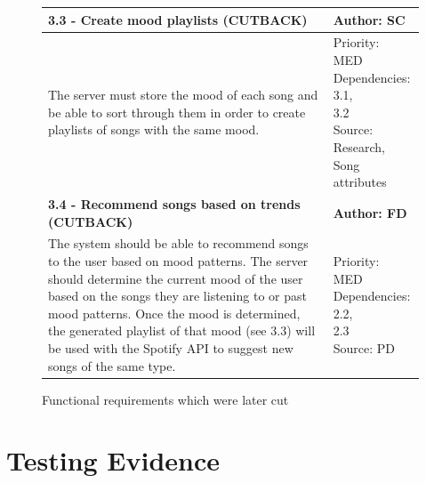 \documentclass[10pt, notitlepage]{report}
\begin{document}
\newpage

\begin{figure}[h]
\centering

\begin{tabular}{| p{13cm} | p{3cm} |}
\hline
\textbf{3.3 - Create mood playlists (CUTBACK)} & \textbf{Author: SC} \\
\hline
The server must store the mood of each song and be able to sort through them in order to create playlists of songs with the same mood. & 
\makecell{Priority: MED\\Dependencies: 3.1,\\3.2\\Source: Research,\\ Song attributes}\\
\hline
\textbf{3.4 - Recommend songs based on trends (CUTBACK)} & \textbf{Author: FD} \\
\hline
The system should be able to recommend songs to the user based on mood patterns. The server should determine the current mood of the user based on the songs they are listening to or past mood patterns. Once the mood is determined, the generated playlist of that mood (see 3.3) will be used with the Spotify API to suggest new songs of the same type. &  
\makecell{Priority: MED\\Dependencies: 2.2,\\ 2.3\\Source: PD}\\
\hline
\end{tabular}

\caption{Functional requirements which were later cut}
\label{fig:cutback}

\end{figure}

\newpage

\section{Testing Evidence}
\label{test}

\newcommand{\testedv}[1]{
\begin{figure}[!h]
	\centering
	\texttt{[image: test/Test\#1-1.png]}
	\caption{Test #1}
	\label{fig:test#1}
\end{figure}

\newpage}

\newcommand{\testedvsub}[1]{
\begin{figure}[!h]
\centering
\begin{subfigure}{0.4\textwidth}
	\texttt{[image: test/Test\#1-1.png]}
	\caption{Test #1 Part 1}
	\label{fig:test#1-1}
\end{subfigure}
\begin{subfigure}{0.4\textwidth}
	\texttt{[image: test/Test\#1-2.png]}
	\caption{Test #1 Part 2}
	\label{fig:test#1-2}
\end{subfigure}
\caption{Test #1}
\label{fig:test#1}
\end{figure}
\newpage}
\end{document}
